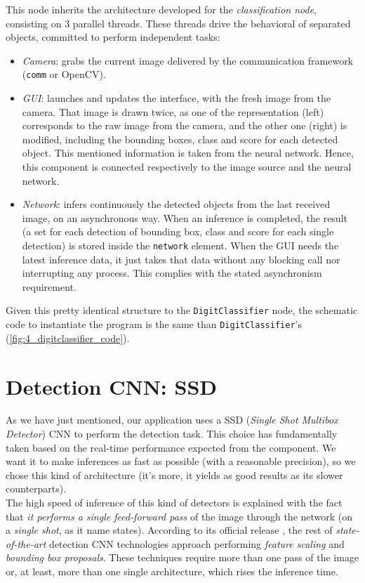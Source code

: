 	This node inherits the architecture developed for the \emph{classification node}, consisting on 3 parallel threads. These threads drive the behavioral of separated objects, committed to perform independent tasks:
	\begin{itemize}
		\item \textit{Camera}: grabs the current image delivered by the communication framework (\texttt{comm} or OpenCV).
		
		\item \textit{GUI}: launches and updates the interface, with the fresh image from the camera. That image is drawn twice, as one of the representation (left) corresponds to the raw image from the camera, and the other one (right) is modified, including the bounding boxes, class and score for each detected object. This mentioned information is taken from the neural network. Hence, this component is connected respectively to the image source and the neural network.
		
		\item \textit{Network}: infers continuously the detected objects from the last received image, on an asynchronous way. When an inference is completed, the result (a set for each detection of bounding box, class and score for each single detection) is stored inside the \texttt{network} element. When the GUI needs the latest inference data, it just takes that data without any blocking call nor interrupting any process. This complies with the stated asynchronism requirement. 
	\end{itemize}
	
	Given this pretty identical structure to the \texttt{DigitClassifier} node, the schematic code to instantiate the program is the same than \texttt{DigitClassifier}'s (\autoref{fig:4_digitclassifier_code}).

	
\section{Detection CNN: SSD}
	As we have just mentioned, our application uses a SSD (\emph{Single Shot Multibox Detector}) CNN to perform the detection task. This choice has fundamentally taken based on the real-time performance expected from the component. We want it to make inferences as fast as possible (with a reasonable precision), so we chose this kind of architecture (it's more, it yields as good results as its slower counterparts).\\
	
	The high speed of inference of this kind of detectors is explained with the fact that \emph{it performs a single feed-forward pass} of the image through the network (on a \emph{single shot}, as it name states). According to its official release \cite{ssd-paper}, the rest of \emph{state-of-the-art} detection CNN technologies approach performing \emph{feature scaling} and \emph{bounding box proposals}. These techniques require more than one pass of the image or, at least, more than one single architecture, which rises the inference time.\\
